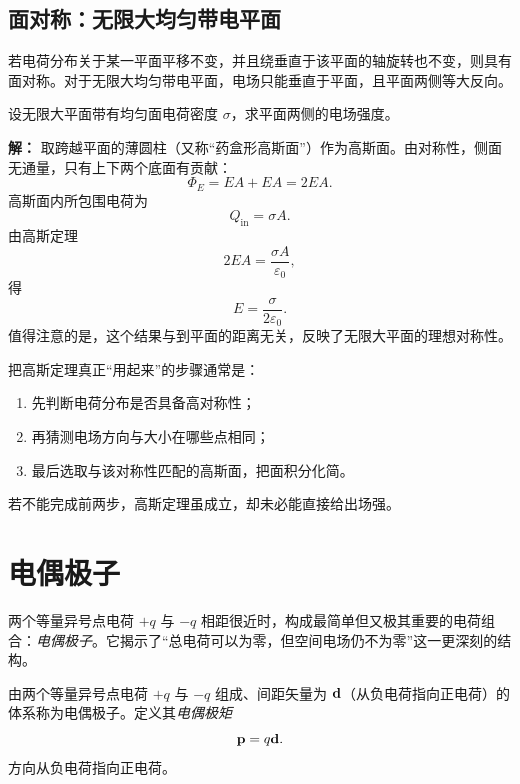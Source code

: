 \subsection*{面对称：无限大均匀带电平面}

若电荷分布关于某一平面平移不变，并且绕垂直于该平面的轴旋转也不变，则具有面对称。对于无限大均匀带电平面，电场只能垂直于平面，且平面两侧等大反向。

\begin{example}[无限大均匀带电平面的电场]
设无限大平面带有均匀面电荷密度 $\sigma$，求平面两侧的电场强度。

\textbf{解：} 取跨越平面的薄圆柱（又称“药盒形高斯面”）作为高斯面。由对称性，侧面无通量，只有上下两个底面有贡献：
\begin{equation}
\Phi_E = EA + EA = 2EA.
\end{equation}
高斯面内所包围电荷为
\begin{equation}
Q_{\text{in}} = \sigma A.
\end{equation}
由高斯定理
\begin{equation}
2EA = \frac{\sigma A}{\varepsilon_0},
\end{equation}
得
\begin{equation}
E = \frac{\sigma}{2\varepsilon_0}.
\end{equation}
值得注意的是，这个结果与到平面的距离无关，反映了无限大平面的理想对称性。
\end{example}

\begin{remark}
把高斯定理真正“用起来”的步骤通常是：
\begin{enumerate}
  \item 先判断电荷分布是否具备高对称性；
  \item 再猜测电场方向与大小在哪些点相同；
  \item 最后选取与该对称性匹配的高斯面，把面积分化简。
\end{enumerate}
若不能完成前两步，高斯定理虽成立，却未必能直接给出场强。
\end{remark}

\section{电偶极子}

两个等量异号点电荷 $+q$ 与 $-q$ 相距很近时，构成最简单但又极其重要的电荷组合：\emph{电偶极子}。它揭示了“总电荷可以为零，但空间电场仍不为零”这一更深刻的结构。

\begin{definition}[电偶极子与电偶极矩]
由两个等量异号点电荷 $+q$ 与 $-q$ 组成、间距矢量为 $\vb{d}$（从负电荷指向正电荷）的体系称为电偶极子。定义其\emph{电偶极矩}
\begin{equation}
\vb{p} = q\vb{d}.
\end{equation}
方向从负电荷指向正电荷。
\end{definition}

